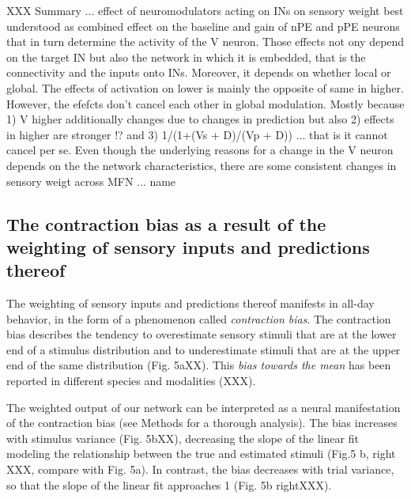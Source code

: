 \documentclass[10pt,a4paper,draft]{article}
\begin{document}
XXX Summary ... effect of neuromodulators acting on INs on sensory weight best understood as combined effect on the baseline and gain of nPE and pPE neurons that in turn determine the activity of the V neuron. Those effects not ony depend on the target IN but also the network in which it is embedded, that is the connectivity and the inputs onto INs. Moreover, it depends on whether local or global. The effects of activation on lower is mainly the opposite of same in higher. However, the efefcts don't cancel each other in global modulation. Mostly because 1) V higher additionally changes due to changes in prediction but also 2) effects in higher are stronger !? and 3) 1/(1+(Vs + D)/(Vp + D)) ... that is it cannot cancel per se. Even though the underlying reasons for a change in the V neuron depends on the the network characteristics, there are some consistent changes in sensory weigt across MFN ... name


\subsection*{The contraction bias as a result of the weighting of sensory inputs and predictions thereof}
% 
The weighting of sensory inputs and predictions thereof manifests in all-day behavior, in the form of a phenomenon called \textit{contraction bias}. The contraction bias describes the tendency to overestimate sensory stimuli that are at the lower end of a stimulus distribution and to underestimate stimuli that are at the upper end of the same distribution (Fig. 5aXX). This \textit{bias towards the mean} has been reported in different species and modalities (XXX). 

The weighted output of our network can be interpreted as a neural manifestation of the contraction bias (see Methods for a thorough analysis). The bias increases with stimulus variance (Fig. 5bXX), decreasing the slope of the linear fit modeling the relationship between the true and estimated stimuli (Fig.5 b, right XXX, compare with Fig. 5a). In contrast, the bias decreases with trial variance, so that the slope of the linear fit approaches 1 (Fig. 5b rightXXX).
\end{document}
